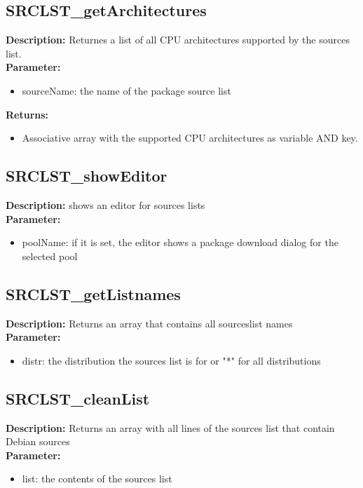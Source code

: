 \subsection{SRCLST\_getArchitectures}
\textbf{Description:} Returnes a list of all CPU architectures supported by the sources list.\\
\textbf{Parameter:}
\begin{itemize}
\item sourceName: the name of the package source list
\end{itemize}
\textbf{Returns:}
\begin{itemize}
\item Associative array with the supported CPU architectures as variable AND key.
\end{itemize}

\subsection{SRCLST\_showEditor}
\textbf{Description:} shows an editor for sources lists\\
\textbf{Parameter:}
\begin{itemize}
\item poolName: if it is set, the editor shows a package download dialog for the selected pool
\end{itemize}

\subsection{SRCLST\_getListnames}
\textbf{Description:} Returns an array that contains all sourceslist names\\
\textbf{Parameter:}
\begin{itemize}
\item distr: the distribution the sources list is for or "*" for all distributions
\end{itemize}

\subsection{SRCLST\_cleanList}
\textbf{Description:} Returns an array with all lines of the sources list that contain Debian sources\\
\textbf{Parameter:}
\begin{itemize}
\item list: the contents of the sources list
\end{itemize}

